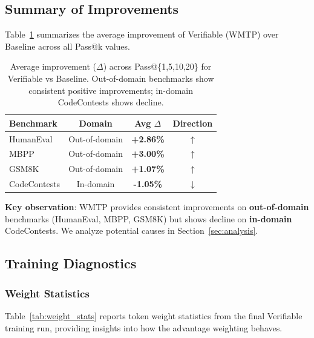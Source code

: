 \subsection{Summary of Improvements}

Table~\ref{tab:improvement_summary} summarizes the average improvement of Verifiable (WMTP) over Baseline across all Pass@k values.

\begin{table}[h]
\centering
\caption{Average improvement ($\Delta$) across Pass@\{1,5,10,20\} for Verifiable vs Baseline. Out-of-domain benchmarks show consistent positive improvements; in-domain CodeContests shows decline.}
\label{tab:improvement_summary}
\begin{tabular}{lccc}
\toprule
\textbf{Benchmark} & \textbf{Domain} & \textbf{Avg $\Delta$} & \textbf{Direction} \\
\midrule
HumanEval & Out-of-domain & \textbf{+2.86\%} & $\uparrow$ \\
MBPP & Out-of-domain & \textbf{+3.00\%} & $\uparrow$ \\
GSM8K & Out-of-domain & \textbf{+1.07\%} & $\uparrow$ \\
CodeContests & In-domain & \textbf{-1.05\%} & $\downarrow$ \\
\bottomrule
\end{tabular}
\end{table}

\textbf{Key observation}: WMTP provides consistent improvements on \textbf{out-of-domain} benchmarks (HumanEval, MBPP, GSM8K) but shows decline on \textbf{in-domain} CodeContests. We analyze potential causes in Section~\ref{sec:analysis}.

\subsection{Training Diagnostics}

\subsubsection{Weight Statistics}

Table~\ref{tab:weight_stats} reports token weight statistics from the final Verifiable training run, providing insights into how the advantage weighting behaves.

